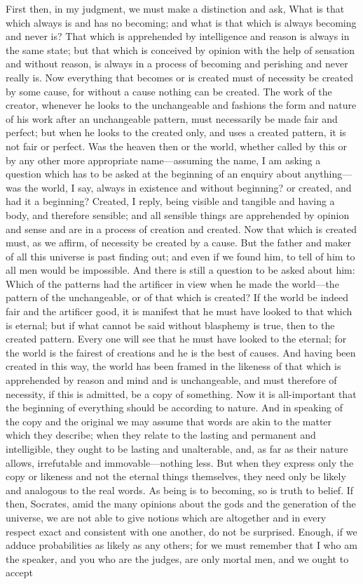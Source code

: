 \documentclass[11pt,letter]{article}
\begin{document}
\par  First then, in my judgment, we must make a distinction and ask, What is that which always is and has no becoming; and what is that which is always becoming and never is? That which is apprehended by intelligence and reason is always in the same state; but that which is conceived by opinion with the help of sensation and without reason, is always in a process of becoming and perishing and never really is. Now everything that becomes or is created must of necessity be created by some cause, for without a cause nothing can be created. The work of the creator, whenever he looks to the unchangeable and fashions the form and nature of his work after an unchangeable pattern, must necessarily be made fair and perfect; but when he looks to the created only, and uses a created pattern, it is not fair or perfect. Was the heaven then or the world, whether called by this or by any other more appropriate name—assuming the name, I am asking a question which has to be asked at the beginning of an enquiry about anything—was the world, I say, always in existence and without beginning? or created, and had it a beginning? Created, I reply, being visible and tangible and having a body, and therefore sensible; and all sensible things are apprehended by opinion and sense and are in a process of creation and created. Now that which is created must, as we affirm, of necessity be created by a cause. But the father and maker of all this universe is past finding out; and even if we found him, to tell of him to all men would be impossible. And there is still a question to be asked about him: Which of the patterns had the artificer in view when he made the world—the pattern of the unchangeable, or of that which is created? If the world be indeed fair and the artificer good, it is manifest that he must have looked to that which is eternal; but if what cannot be said without blasphemy is true, then to the created pattern. Every one will see that he must have looked to the eternal; for the world is the fairest of creations and he is the best of causes. And having been created in this way, the world has been framed in the likeness of that which is apprehended by reason and mind and is unchangeable, and must therefore of necessity, if this is admitted, be a copy of something. Now it is all-important that the beginning of everything should be according to nature. And in speaking of the copy and the original we may assume that words are akin to the matter which they describe; when they relate to the lasting and permanent and intelligible, they ought to be lasting and unalterable, and, as far as their nature allows, irrefutable and immovable—nothing less. But when they express only the copy or likeness and not the eternal things themselves, they need only be likely and analogous to the real words. As being is to becoming, so is truth to belief. If then, Socrates, amid the many opinions about the gods and the generation of the universe, we are not able to give notions which are altogether and in every respect exact and consistent with one another, do not be surprised. Enough, if we adduce probabilities as likely as any others; for we must remember that I who am the speaker, and you who are the judges, are only mortal men, and we ought to accept 
\end{document}
